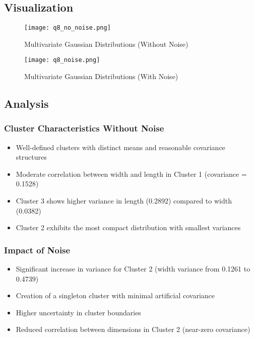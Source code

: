 \documentclass[12pt]{article}
\begin{document}
\vspace{1cm}

\subsection{Visualization}
\begin{figure}[H]
    \centering
    \texttt{[image: q8\_no\_noise.png]}
    \caption{Multivariate Gaussian Distributions (Without Noise)}
\end{figure}
\begin{figure}[H]
    \centering
    \texttt{[image: q8\_noise.png]}
    \caption{Multivariate Gaussian Distributions (With Noise)}
\end{figure}

\subsection{Analysis}

\subsubsection{Cluster Characteristics Without Noise}
\begin{itemize}
    \item Well-defined clusters with distinct means and reasonable covariance structures
    \item Moderate correlation between width and length in Cluster 1 (covariance = 0.1528)
    \item Cluster 3 shows higher variance in length (0.2892) compared to width (0.0382)
    \item Cluster 2 exhibits the most compact distribution with smallest variances
\end{itemize}

\subsubsection{Impact of Noise}
\begin{itemize}
    \item Significant increase in variance for Cluster 2 (width variance from 0.1261 to 0.4739)
    \item Creation of a singleton cluster with minimal artificial covariance
    \item Higher uncertainty in cluster boundaries
    \item Reduced correlation between dimensions in Cluster 2 (near-zero covariance)
\end{itemize}
\end{document}
